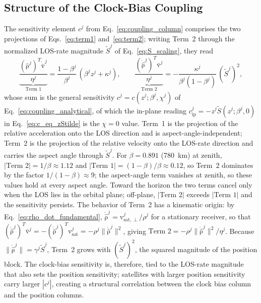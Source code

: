 \documentclass[letterpaper,times]{IONconf-v2}
\theoremstyle{plain}
\theoremstyle{remark}
\renewcommand{\vec}[1]{{\boldsymbol{\mathrm{#1}}}}
\begin{document}
\vspace{-10pt}

\subsection{Structure of the Clock-Bias Coupling}\label{subsec:coupling_structure}

The sensitivity element $c^j$ from Eq.~\eqref{eq:coupling_column} comprises the two projections of Eqs.~\eqref{eq:term1} and~\eqref{eq:term2}; writing Term~2 through the normalized LOS-rate magnitude $\tilde S^j$ of Eq.~\eqref{eq:S_scaling}, they read
%
\begin{equation}\label{eq:term1_restate}
\underbrace{\frac{(\hat{\vec\rho}^j)^T \dot{\bar{\vec{v}}}^j}{\eta^j}}_{\text{Term 1}} = \frac{1-\beta^j}{\beta^j}\,(\beta^j z^j + \kappa^j),
\qquad
\underbrace{\frac{(\dot{\hat{\vec\rho}}^j)^T \bar{\vec{v}}^j}{\eta^j}}_{\text{Term 2}} = -\frac{\kappa^j}{\beta^j(1-\beta^j)}\,(\tilde S^j)^2,
\end{equation}
%
whose sum is the general sensitivity $c^j = c(z^j;\beta^j,\chi^j)$ of Eq.~\eqref{eq:coupling_analytical}, of which the in-plane reading $c_{\mathrm{ip}}^j = -z^j\tilde S(z^j;\beta^j,0)$ in Eq.~\eqref{eq:c_eq_zStilde} is the $\chi=0$ value. Term~1 is the projection of the relative acceleration onto the LOS direction and is aspect-angle-independent; Term~2 is the projection of the relative velocity onto the LOS-rate direction and carries the aspect angle through $\tilde S^j$. For $\beta = 0.891$ (780~km) at zenith, $|\text{Term 2}| = 1/\beta \approx 1.12$ and $|\text{Term 1}| = (1-\beta)/\beta \approx 0.12$, so Term~2 dominates by the factor $1/(1-\beta) \approx 9$; the aspect-angle term vanishes at zenith, so these values hold at every aspect angle. Toward the horizon the two terms cancel only when the LOS lies in the orbital plane; off-plane, $|\text{Term 2}|$ exceeds $|\text{Term 1}|$ and the sensitivity persists. The behavior of Term~2 has a kinematic origin: by Eq.~\eqref{eq:rho_dot_fundamental}, $\dot{\hat{\vec\rho}}^j = \vec{v}_{\mathrm{sat},\perp}^j/\rho^j$ for a stationary receiver, so that $(\dot{\hat{\vec\rho}}^j)^T \bar{\vec{v}}^j = -(\dot{\hat{\vec\rho}}^j)^T \vec{v}_{\mathrm{sat}}^j = -\rho^j\|\dot{\hat{\vec\rho}}^j\|^2$, giving $\text{Term 2} = -\rho^j\|\dot{\hat{\vec\rho}}^j\|^2/\eta^j$. Because $\|\dot{\hat{\vec\rho}}^j\| = \gamma^j\tilde S^j$, Term~2 grows with $(\tilde S^j)^2$, the squared magnitude of the position block. The clock-bias sensitivity is, therefore, tied to the LOS-rate magnitude that also sets the position sensitivity; satellites with larger position sensitivity carry larger $|c^j|$, creating a structural correlation between the clock bias column and the position columns.
\end{document}
